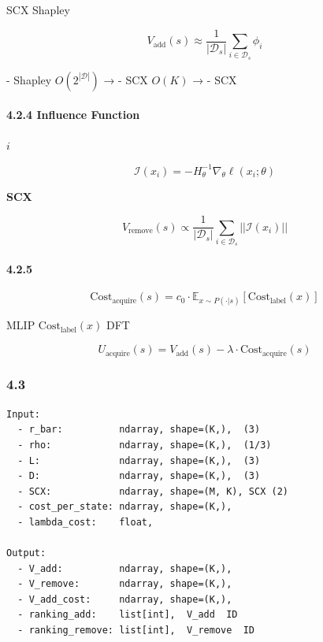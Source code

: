 \documentclass[
  12pt,
]{article}
\begin{document}
SCX  Shapley \textbf{}

\[
V_{\text{add}}(s) \approx \frac{1}{|\mathcal{D}_s|} \sum_{i \in \mathcal{D}_s} \phi_i
\]

 - Shapley  \(O(2^{|\mathcal{D}|})\)  →
 - SCX  \(O(K)\)  →  - SCX


\paragraph{4.2.4  Influence Function
}\label{ux4e0e-influence-function-ux7684ux5173ux7cfb}

\textbf{} \(i\) 

\[
\mathcal{I}(x_i) = -H_\theta^{-1} \nabla_\theta \ell(x_i; \theta)
\]

\textbf{SCX }

\[
V_{\text{remove}}(s) \propto \frac{1}{|\mathcal{D}_s|} \sum_{i \in \mathcal{D}_s} ||\mathcal{I}(x_i)||
\]



\paragraph{4.2.5
}\label{ux6210ux672cux654fux611fux7684ux4f30ux503c}

\textbf{}

\[
\text{Cost}_{\text{acquire}}(s) = c_0 \cdot \mathbb{E}_{x \sim P(\cdot|s)}[\text{Cost}_{\text{label}}(x)]
\]

 MLIP \(\text{Cost}_{\text{label}}(x)\)  DFT


\textbf{}

\[
U_{\text{acquire}}(s) = V_{\text{add}}(s) - \lambda \cdot \text{Cost}_{\text{acquire}}(s)
\]

\subsubsection{4.3
}\label{ux8f93ux5165ux8f93ux51faux89c4ux8303-3}

\begin{verbatim}
Input:
  - r_bar:          ndarray, shape=(K,),  (3)
  - rho:            ndarray, shape=(K,),  (1/3)
  - L:              ndarray, shape=(K,),  (3)
  - D:              ndarray, shape=(K,),  (3)
  - SCX:            ndarray, shape=(M, K), SCX (2)
  - cost_per_state: ndarray, shape=(K,), 
  - lambda_cost:    float, 

Output:
  - V_add:          ndarray, shape=(K,), 
  - V_remove:       ndarray, shape=(K,), 
  - V_add_cost:     ndarray, shape=(K,), 
  - ranking_add:    list[int],  V_add  ID
  - ranking_remove: list[int],  V_remove  ID
\end{verbatim}
\end{document}
